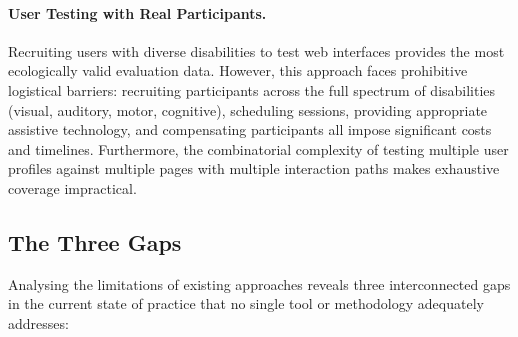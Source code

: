 \paragraph{User Testing with Real Participants.}
Recruiting users with diverse disabilities to test web interfaces provides the most ecologically valid evaluation data. However, this approach faces prohibitive logistical barriers: recruiting participants across the full spectrum of disabilities (visual, auditory, motor, cognitive), scheduling sessions, providing appropriate assistive technology, and compensating participants all impose significant costs and timelines. Furthermore, the combinatorial complexity of testing multiple user profiles against multiple pages with multiple interaction paths makes exhaustive coverage impractical.

\subsection{The Three Gaps}

Analysing the limitations of existing approaches reveals three interconnected gaps in the current state of practice that no single tool or methodology adequately addresses:

